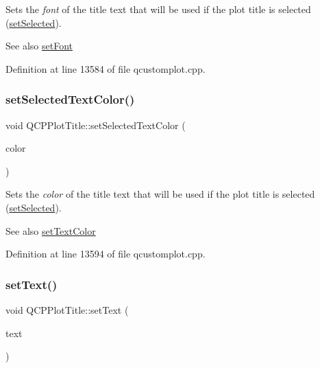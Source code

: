 Sets the {\itshape font} of the title text that will be used if the plot title is selected (\hyperlink{class_q_c_p_plot_title_a8d441a889d371307df86f1ab7687a333}{set\+Selected}).

\begin{DoxySeeAlso}{See also}
\hyperlink{class_q_c_p_plot_title_a199fc7170802ea65006c371875349e37}{set\+Font} 
\end{DoxySeeAlso}


Definition at line 13584 of file qcustomplot.\+cpp.

\mbox{\label{class_q_c_p_plot_title_a09ffd8c52ac8824d00382f84be391b66}} 
\subsubsection{\texorpdfstring{set\+Selected\+Text\+Color()}{setSelectedTextColor()}}
{\footnotesize\ttfamily void Q\+C\+P\+Plot\+Title\+::set\+Selected\+Text\+Color (\begin{DoxyParamCaption}\item[{const Q\+Color \&}]{color }\end{DoxyParamCaption})}

Sets the {\itshape color} of the title text that will be used if the plot title is selected (\hyperlink{class_q_c_p_plot_title_a8d441a889d371307df86f1ab7687a333}{set\+Selected}).

\begin{DoxySeeAlso}{See also}
\hyperlink{class_q_c_p_plot_title_a71273e3a0ca6b4c151591b37b9e5ce33}{set\+Text\+Color} 
\end{DoxySeeAlso}


Definition at line 13594 of file qcustomplot.\+cpp.

\mbox{\label{class_q_c_p_plot_title_aae5a93e88050dfb2cbf6adc087516821}} 
\subsubsection{\texorpdfstring{set\+Text()}{setText()}}
{\footnotesize\ttfamily void Q\+C\+P\+Plot\+Title\+::set\+Text (\begin{DoxyParamCaption}\item[{const Q\+String \&}]{text }\end{DoxyParamCaption})}

